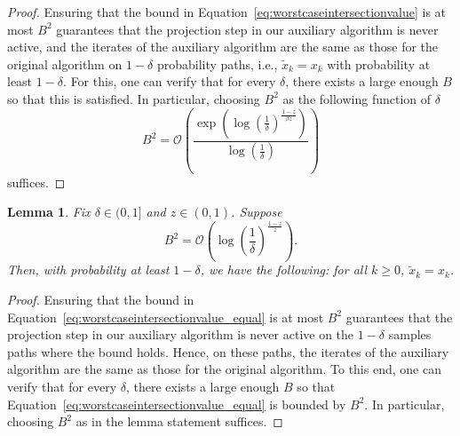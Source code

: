 \documentclass{article}
\newcommand{\lrp}[1]{\left( #1 \right)}
\newtheorem{lemma}[theorem]{Lemma}
\begin{document}
\begin{proof}
Ensuring that the bound in  Equation~\eqref{eq:worstcaseintersectionvalue} is at most $B^2$ guarantees that the projection step in our auxiliary algorithm is never active, and the iterates of the auxiliary algorithm are the same as those for the original algorithm on $1-\delta$ probability paths, i.e., $\tilde{x}_k = x_k$ with probability at least $1-\delta$. For this, one can verify that for every $\delta$, there exists a large enough $B$ so that this is satisfied. In particular,  choosing $B^2$ as the following function of $\delta$ 
\[ B^2 = \mathcal{O}\lrp{\frac{\exp\lrp{ \log\left(\frac{1}{\delta}\right)^\frac{1-z}{\beta z} }}{\log\left(\frac{1}{\delta}\right)}} \]
suffices.
\end{proof}


\begin{lemma}\label{lem:ballradius3}
    Fix $\delta\in(0,1]$  and $z\in (0,1)$. Suppose 
    \[ B^2 = \mathcal{O}\lrp{\log\left(\frac{1}{\delta}\right)^\frac{1-z}{z}}.\]
    Then, with probability at least $1-\delta$, we have the following: for all $k\ge 0$, $\tilde{x}_k = x_k$.
\end{lemma}

\begin{proof}
Ensuring that the bound in Equation~\eqref{eq:worstcaseintersectionvalue_equal} is at most $B^2$ guarantees that the projection step in our auxiliary algorithm is never active on the $1-\delta$ samples paths where the bound holds. Hence, on these paths, the iterates of the auxiliary algorithm are the same as those for the original algorithm. To this end, one can verify that for every $\delta$, there exists a large enough $B$ so that Equation~\eqref{eq:worstcaseintersectionvalue_equal} is bounded by $B^2$. In particular, choosing $B^2$ as in the lemma statement suffices.
\end{proof}
\end{document}
